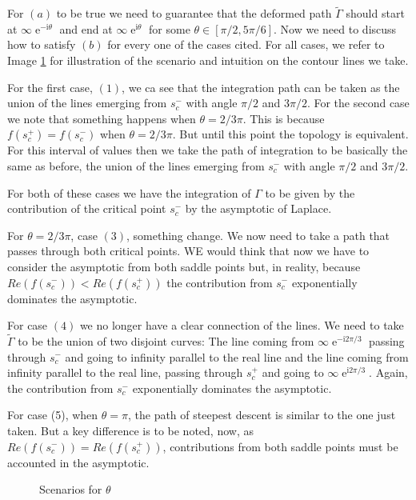 \documentclass[]{report}
\DeclareMathOperator{\ee}{e}
\newcommand{\ii}{\mathrm{i}}
\numberwithin{equation}{section} %
\begin{document}
For $(a)$ to be true we need to guarantee that the deformed path $\tilde{\Gamma}$ should start at $\infty \ee^{-\ii \theta}$ and end at $\infty \ee^{\ii \theta}$ for some $\theta \in [\pi/2, 5\pi/6]$. Now we need to discuss how to satisfy $(b)$ for every one of the cases cited. For all cases, we refer to Image \ref{Fig: theta cases} for illustration of the scenario and intuition on the contour lines we take.

For the first case, $(1)$, we  ca see that the integration path can be taken as the union of the lines emerging from $s_c^-$ with angle $\pi/2$ and $3\pi/2$. For the second case we note that something happens when $\theta = 2/3 \pi$. This is because $f(s_c^+) = f(s_c^-)$ when $\theta = 2/3 \pi$. But until this point the topology is equivalent. For this interval of values then we take the path of integration to be basically the same as before, the union of the lines emerging from $s_c^-$ with angle $\pi/2$ and $3\pi/2$.

For both of these cases we have the integration of $\Gamma$ to be given by the contribution of the critical point $s_c^-$ by the asymptotic of Laplace.

For $\theta = 2/3 \pi$, case $(3)$, something change. We now need to take a path that passes through both critical points. WE would think that now we have to consider the asymptotic from both saddle points but, in reality, because $Re(f(s_c^-)) < Re(f(s_c^+))$ the contribution from $s_c^-$ exponentially dominates the asymptotic.

For case $(4)$ we no longer have a clear connection of the lines. We need to take $\tilde{\Gamma}$ to be the union of two disjoint curves: The line coming from $\infty \ee^{-\ii 2\pi/3}$ passing through $s_c^-$ and going to infinity parallel to the real line and the line coming from infinity parallel to the real line, passing through $s_c^+$ and going to $\infty \ee^{\ii 2\pi/3}$. Again,  the contribution from $s_c^-$ exponentially dominates the asymptotic.

For case (5), when $\theta = \pi$, the path of steepest descent is similar to the one just taken. But a key difference is to be noted, now, as $Re(f(s_c^-)) = Re(f(s_c^+))$, contributions from both saddle points must be accounted in the asymptotic.


\begin{figure}[h] 
	\centering
	\caption{Scenarios for $\theta$}
	\label{Fig: theta cases}
\end{figure}
\end{document}
